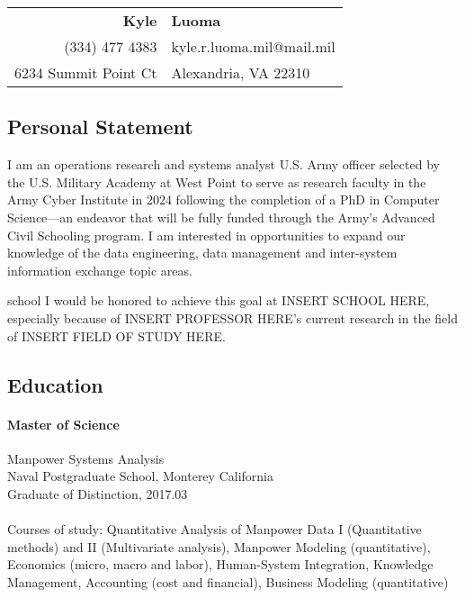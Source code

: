 \documentclass[12pt,letterpaper]{article}
\begin{document}
\begin{center}
\begin{tabular}{rl}
\huge\textbf{Kyle} &\huge\textbf{Luoma}\\
(334) 477 4383 &kyle.r.luoma.mil@mail.mil\\
6234 Summit Point Ct &Alexandria, VA 22310\end{tabular}
\end{center}
\subsection{Personal Statement}
I am an operations research and systems analyst U.S. Army officer selected by the U.S. Military Academy at West Point to serve as research faculty in the Army Cyber Institute in 2024 following the completion of a PhD in Computer Science---an endeavor that will be fully funded through the Army's Advanced Civil Schooling program. I am interested in opportunities to expand our knowledge of the data engineering, data management and inter-system information exchange topic areas. 

\begin{shownto}{school}
I would be honored to achieve this goal at INSERT SCHOOL HERE, especially because of INSERT PROFESSOR HERE's current research in the field of INSERT FIELD OF STUDY HERE.
\end{shownto}

\subsection{Education}
\paragraph{Master of Science} 
Manpower Systems Analysis \\
Naval Postgraduate School, Monterey California\\
Graduate of Distinction, 2017.03\\
 \\
Courses of study: Quantitative Analysis of Manpower Data I (Quantitative methods) and II (Multivariate analysis), Manpower Modeling (quantitative), Economics (micro, macro and labor), Human-System Integration, Knowledge Management, Accounting (cost and financial), Business Modeling (quantitative)
\end{document}
